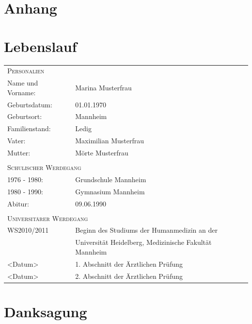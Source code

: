 \documentclass{scrreprt}
\begin{document}
\chapter*{Anhang}




\chapter*{Lebenslauf}

\begin{tabular}{p{4cm}l}
	\multicolumn{2}{l}{{\large \scshape{Personalien}}} \\[0,6em]
	
	Name und Vorname:	& Marina Musterfrau \\[0,5em]
	
	Geburtsdatum: 		& 01.01.1970 \\[0,5em]
	
	Geburtsort: 		& Mannheim \\[0,5em]
	
	Familienstand: 		& Ledig\\[0,5em]
	
	Vater: 				& Maximilian Musterfrau \\[0,5em]
	
	Mutter: 			& Mörte Musterfrau \\[0,5em]
	& \\[0,5em]
	\multicolumn{2}{l}{{\Large \scshape{Schulischer Werdegang}}} \\[0,6em]
	
	1976 - 1980: 	& Grundschule Mannheim\\[0,5em]

	1980 - 1990: 	& Gymnasium Mannheim\\[0,5em]

	Abitur: 			& 09.06.1990 \\[0,5em]
	&\\[0,5em]
		\multicolumn{2}{l}{{\Large \scshape{Universitärer Werdegang}}} \\[0,6em]
	WS2010/2011			& Beginn des Studiums der Humanmedizin an der \\
						& Universität Heidelberg, Medizinische Fakultät Mannheim\\ [0,5em]
						
	<Datum> 		& 1. Abschnitt der Ärztlichen Prüfung\\
	<Datum> 		& 2. Abschnitt der Ärztlichen Prüfung
\end{tabular}



\chapter*{Danksagung}
\end{document}
